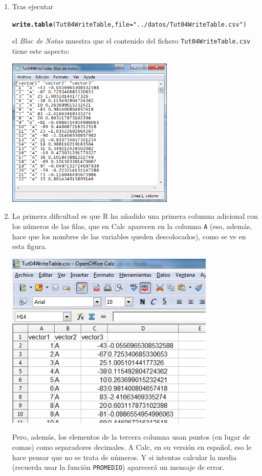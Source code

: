 \documentclass[10pt,a4paper]{article}\usepackage[]{graphicx}\usepackage[]{color}
\makeatletter
\newcommand{\hlstr}[1]{\textcolor[rgb]{0.192,0.494,0.8}{#1}}%
\newcommand{\hlstd}[1]{\textcolor[rgb]{0.345,0.345,0.345}{#1}}%
\newcommand{\hlkwc}[1]{\textcolor[rgb]{0.333,0.667,0.333}{#1}}%
\newcommand{\hlkwd}[1]{\textcolor[rgb]{0.737,0.353,0.396}{\textbf{#1}}}%
\newenvironment{kframe}{%
 \def\at@end@of@kframe{}%
 \ifinner\ifhmode%
  \def\at@end@of@kframe{\end{minipage}}%
  \begin{minipage}{\columnwidth}%
 \fi\fi%
 \def\FrameCommand##1{\hskip\@totalleftmargin \hskip-\fboxsep
 \colorbox{shadecolor}{##1}\hskip-\fboxsep
     \hskip-\linewidth \hskip-\@totalleftmargin \hskip\columnwidth}%
 \MakeFramed {\advance\hsize-\width
   \@totalleftmargin\z@ \linewidth\hsize
   \@setminipage}}%
 {\par\unskip\endMakeFramed%
 \at@end@of@kframe}
\newenvironment{knitrout}{}{} %
\newcounter {cont01}
\makeatother
\begin{document}
\begin{enumerate}
  \item Tras ejecutar
\begin{knitrout}
\color{fgcolor}\begin{kframe}
\begin{alltt}
  \hlkwd{write.table}\hlstd{(Tut04WriteTable,} \hlkwc{file}\hlstd{=}\hlstr{"../datos/Tut04WriteTable.csv"}\hlstd{)}
\end{alltt}
\end{kframe}
\end{knitrout}
  el {\em Bloc de Notas} muestra que el contenido del fichero  {\tt Tut04WriteTable.csv} tiene este aspecto:
  \begin{center}
  \includegraphics[width=8cm]{../fig/Tut04-18.png}
  \end{center}


  \item La primera dificultad es que R ha añadido una primera columna adicional con los números de las filas, que en Calc aparecen en la columna {\tt A} (eso, además, hace que los nombres de las variables queden descolocados), como se ve en esta figura.
  \begin{center}
  \includegraphics[width=10cm]{../fig/Tut04-19.png}
  \end{center}
  Pero, además, los elementos de la tercera columna usan puntos (en lugar de comas) como separadores decimales. A Calc, en su versión en español, eso le hace pensar que no se trata de números. Y si intentas calcular la media (recuerda usar la función {\tt PROMEDIO}) aparecerá un mensaje de error.


\end{enumerate}
\end{document}
